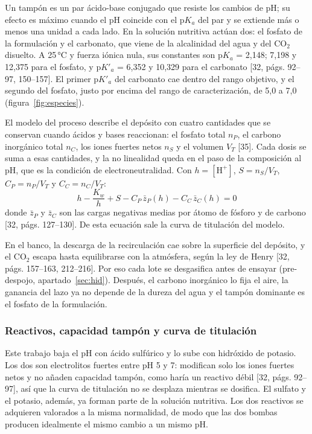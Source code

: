 Un tampón es un par ácido-base conjugado que resiste los cambios de pH; su efecto es máximo cuando el pH coincide con el p$K_a$ del par y se extiende más o menos una unidad a cada lado. En la solución nutritiva actúan dos: el fosfato de la formulación y el carbonato, que viene de la alcalinidad del agua y del CO$_2$ disuelto. A 25\,°C y fuerza iónica nula, sus constantes son p$K_a$ = 2,148; 7,198 y 12,375 para el fosfato, y p$K'_a$ = 6,352 y 10,329 para el carbonato [32, págs. 92–97, 150–157]. El primer p$K'_a$ del carbonato cae dentro del rango objetivo, y el segundo del fosfato, justo por encima del rango de caracterización, de 5,0 a 7,0 (figura~\ref{fig:especies}).


El modelo del proceso describe el depósito con cuatro cantidades que se conservan cuando ácidos y bases reaccionan: el fosfato total $n_P$, el carbono inorgánico total $n_C$, los iones fuertes netos $n_S$ y el volumen $V_T$ [35]. Cada dosis se suma a esas cantidades, y la no linealidad queda en el paso de la composición al pH, que es la condición de electroneutralidad. Con $h=[\mathrm{H^+}]$, $S=n_S/V_T$, $C_P=n_P/V_T$ y $C_C=n_C/V_T$:
\begin{equation}
h-\frac{K_w}{h}+S-C_P\,\bar z_P(h)-C_C\,\bar z_C(h)=0\label{eq:electro}
\end{equation}
donde $\bar z_P$ y $\bar z_C$ son las cargas negativas medias por átomo de fósforo y de carbono [32, págs. 127–130]. De esta ecuación sale la curva de titulación del modelo.

En el banco, la descarga de la recirculación cae sobre la superficie del depósito, y el CO$_2$ escapa hasta equilibrarse con la atmósfera, según la ley de Henry [32, págs. 157–163, 212–216]. Por eso cada lote se desgasifica antes de ensayar (pre-despojo, apartado~\ref{sec:hid}). Después, el carbono inorgánico lo fija el aire, la ganancia del lazo ya no depende de la dureza del agua y el tampón dominante es el fosfato de la formulación.

\subsubsection{Reactivos, capacidad tampón y curva de titulación}\label{sec:tampon}
Este trabajo baja el pH con ácido sulfúrico y lo sube con hidróxido de potasio. Los dos son electrolitos fuertes entre pH 5 y 7: modifican solo los iones fuertes netos y no añaden capacidad tampón, como haría un reactivo débil [32, págs. 92–97], así que la curva de titulación no se desplaza mientras se dosifica. El sulfato y el potasio, además, ya forman parte de la solución nutritiva. Los dos reactivos se adquieren valorados a la misma normalidad, de modo que las dos bombas producen idealmente el mismo cambio a un mismo pH.

